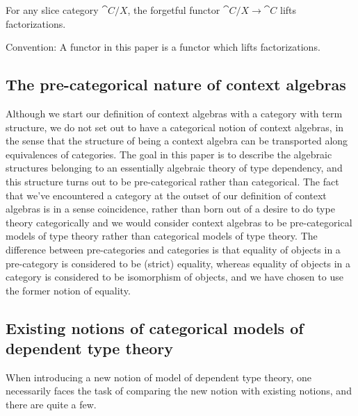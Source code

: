 \begin{eg}
For any slice category $\cat{C}/X$, the forgetful functor $\cat{C}/X\to\cat{C}$
lifts factorizations.
\end{eg}

Convention: A functor in this paper is a functor which lifts factorizations.

\subsection*{The pre-categorical nature of context algebras}
Although we start our definition of context algebras with a category with term structure,
we do not set out to have a categorical notion of context algebras, in the sense that the structure of
being a context algebra can be transported along equivalences of categories. The goal
in this paper is to describe the algebraic structures belonging to an essentially
algebraic theory of type dependency, and this structure turns out to be pre-categorical
rather than categorical. The fact that we've encountered a category at the outset
of our definition of context algebras is in a sense coincidence, rather than born out
of a desire to do type theory categorically and we would consider context algebras to
be pre-categorical models of type theory rather than categorical models of type
theory. The difference between pre-categories and categories is that equality
of objects in a pre-category is considered to be (strict) equality, whereas
equality of objects in a category is considered to be isomorphism of objects,
and we have chosen to use the former notion of equality.

\subsection*{Existing notions of categorical models of dependent type theory}

When introducing a new notion of model of dependent type theory, one necessarily
faces the task of comparing the new notion with existing notions, and there are
quite a few. 

